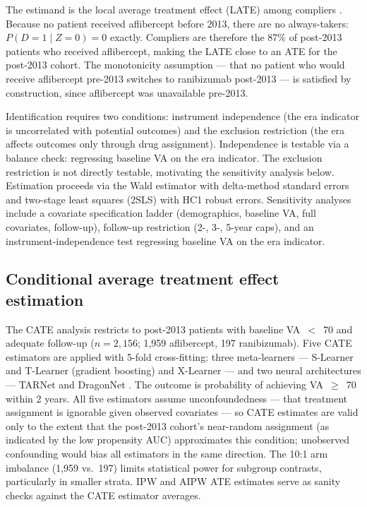 \documentclass{article}
\begin{document}
The estimand is the local average treatment effect (LATE) among compliers \citep{imbens1994, angrist1996}. Because no patient received aflibercept before 2013, there are no always-takers: $P(D=1 \mid Z=0) = 0$ exactly. Compliers are therefore the 87\% of post-2013 patients who received aflibercept, making the LATE close to an ATE for the post-2013 cohort. The monotonicity assumption \citep{imbens1994} --- that no patient who would receive aflibercept pre-2013 switches to ranibizumab post-2013 --- is satisfied by construction, since aflibercept was unavailable pre-2013.

Identification requires two conditions: instrument independence (the era indicator is uncorrelated with potential outcomes) and the exclusion restriction (the era affects outcomes only through drug assignment). Independence is testable via a balance check: regressing baseline VA on the era indicator. The exclusion restriction is not directly testable, motivating the sensitivity analysis below. Estimation proceeds via the Wald estimator with delta-method standard errors and two-stage least squares (2SLS) with HC1 robust errors. Sensitivity analyses include a covariate specification ladder (demographics, baseline VA, full covariates, follow-up), follow-up restriction (2-, 3-, 5-year caps), and an instrument-independence test regressing baseline VA on the era indicator.

\subsection{Conditional average treatment effect estimation}

The CATE analysis restricts to post-2013 patients with baseline VA~$<$~70 and adequate follow-up ($n = 2{,}156$; 1,959 aflibercept, 197 ranibizumab). Five CATE estimators are applied with 5-fold cross-fitting: three meta-learners --- S-Learner and T-Learner (gradient boosting) and X-Learner \citep{kunzel2019} --- and two neural architectures --- TARNet \citep{shalit2017} and DragonNet \citep{shi2019}. The outcome is probability of achieving VA~$\geq$~70 within 2 years. All five estimators assume unconfoundedness --- that treatment assignment is ignorable given observed covariates --- so CATE estimates are valid only to the extent that the post-2013 cohort's near-random assignment (as indicated by the low propensity AUC) approximates this condition; unobserved confounding would bias all estimators in the same direction. The 10:1 arm imbalance (1,959 vs.\ 197) limits statistical power for subgroup contrasts, particularly in smaller strata. IPW and AIPW ATE estimates serve as sanity checks against the CATE estimator averages.
\end{document}
